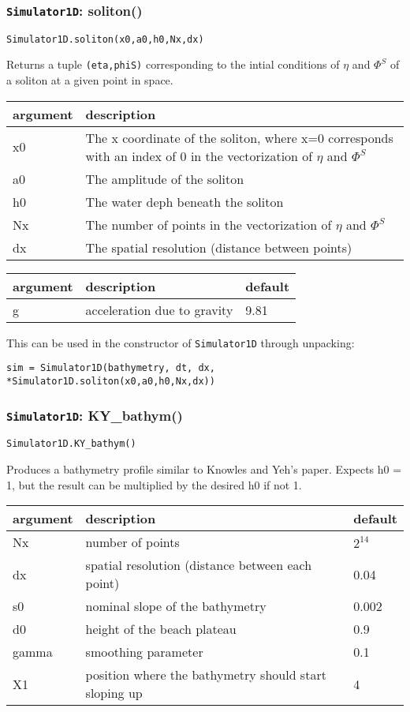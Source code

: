 \documentclass[10pt,a4paper]{article}
\newenvironment{arglist}
    {\begin{center}
    \begin{tabular}{l|p{12cm}}
    argument & description\\
    \hline
    }
    { 
    \end{tabular} 
    \end{center}
    }
\newenvironment{optarglist}
    {\begin{center}
    \begin{tabular}{l|p{10cm}|l}
    argument & description & default\\
    \hline
    }
    { 
    \end{tabular} 
    \end{center}
    }
\begin{document}
\subsubsection{\texttt{Simulator1D}: soliton()}
\texttt{Simulator1D.soliton(x0,a0,h0,Nx,dx)}

Returns a tuple \texttt{(eta,phiS)} corresponding to the intial conditions of $\eta$ and $\Phi^S$ of a soliton at a given point in space.

\begin{arglist}
        x0   & The x coordinate of the soliton, where
                x=0 corresponds with an index of 0 in the vectorization
                of $\eta$ and $\Phi^S$\\\hline
        a0   & The amplitude of the soliton\\\hline
        h0   & The water deph beneath the soliton\\\hline
        Nx   & The number of points in the vectorization of $\eta$ and $\Phi^S$\\\hline
        dx   & The spatial resolution (distance between points)\\\hline
\end{arglist}

\begin{optarglist}
g & acceleration due to gravity & 9.81\\
\end{optarglist}

This can be used in the constructor of \texttt{Simulator1D} through unpacking:

\texttt{sim = Simulator1D(bathymetry, dt, dx, *Simulator1D.soliton(x0,a0,h0,Nx,dx))}





\subsubsection{\texttt{Simulator1D}: KY\_bathym()}
\texttt{Simulator1D.KY\_bathym()}

Produces a bathymetry profile similar to Knowles and Yeh's paper.
        Expects h0 = 1, but the result can be multiplied by the desired h0 if not 1.

\begin{optarglist}

        Nx    & number of points & $2^{14}$\\\hline
        dx    & spatial resolution (distance between each point) & 0.04\\\hline
        s0    &  nominal slope of the bathymetry & 0.002 \\\hline
        d0    & height of the beach plateau & 0.9 \\\hline
        gamma & smoothing parameter & 0.1 \\\hline
        X1    & position where the bathymetry should start sloping up & 4\\\hline
\end{optarglist}
\end{document}
